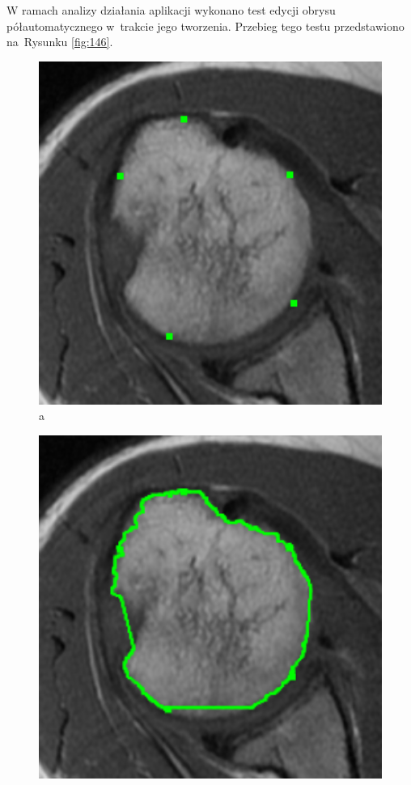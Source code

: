 \documentclass[a4paper,11pt,twoside,openright]{report}
\theoremstyle{definition}
\begin{document}
\pagebreak

W ramach analizy działania aplikacji wykonano test edycji obrysu półautomatycznego w~trakcie
jego tworzenia. Przebieg tego testu przedstawiono na~Rysunku \ref{fig:146}.

\begin{figure}[h!]
\begin{center}
	\begin{center}
		\includegraphics[width=1.0\textwidth]{146}
		a
	\end{center}
	\endminipage\hfill
	\begin{center}
		\includegraphics[width=1.0\textwidth]{147}

\end{center}
\end{center}
\end{figure}
\end{document}

